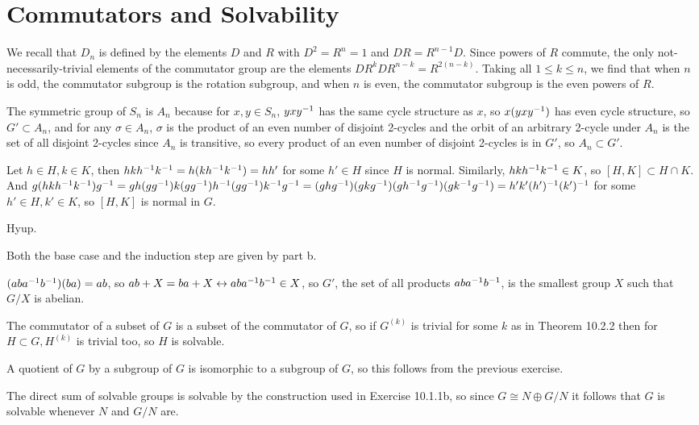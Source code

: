 \documentclass[11pt, oneside]{article}   	%
\begin{document}
\section{Commutators and Solvability}
\be
\item We recall that $D_n$ is defined by the elements $D$ and $R$ with $D^2 = R^n = 1$ and $DR = R^{n-1}D$. Since powers of $R$ commute, the only not-necessarily-trivial elements of the commutator group are the elements $DR^kDR^{n-k} = R^{2(n-k)}$. Taking all $1 \le k \le n$, we find that when $n$ is odd, the commutator subgroup is the rotation subgroup, and when $n$ is even, the commutator subgroup is the even powers of $R$.
\item The symmetric group of $S_n$ is $A_n$ because for $x, y \in S_n$, $yxy^{-1}$ has the same cycle structure as $x$, so $x(yxy^{-1})$ has even cycle structure, so $G' \subset A_n$, and for any $\sigma \in A_n$, $\sigma$ is the product of an even number of disjoint 2-cycles and the orbit of an arbitrary 2-cycle under $A_n$ is the set of all disjoint 2-cycles since $A_n$ is transitive, so every product of an even number of disjoint 2-cycles is in $G'$, so $A_n \subset G'$. 
\item \be
\item Let $h \in H, k \in K$, then $hkh^{-1} k^{-1} = h(kh^{-1} k^{-1}) = hh'$ for some $h' \in H$ since $H$ is normal. Similarly, $hkh^{-1} k^{-1} \in K$, so $[H, K] \subset H \cap K$. And $g(hkh^{-1} k^{-1})g^{-1} = gh(gg^{-1})k(gg^{-1})h^{-1}(gg^{-1})k^{-1} g^{-1} = (ghg^{-1})(gkg^{-1})(gh^{-1} g^{-1})(gk^{-1} g^{-1}) = h'k'(h')^{-1}(k')^{-1}$ for some $h' \in H, k' \in K$, so $[H, K]$ is normal in $G$.
\item Hyup.
\item Both the base case and the induction step are given by part b.
\ee
\item $(aba^{-1} b^{-1})(ba) = ab$, so $ab + X = ba + X \leftrightarrow aba^{-1} b^{-1} \in X$, so $G'$, the set of all products $aba^{-1} b^{-1}$, is the smallest group $X$ such that $G/X$ is abelian.
\item The commutator of a subset of $G$ is a subset of the commutator of $G$, so if $G^{(k)}$ is trivial for some $k$ as in Theorem 10.2.2 then for $H \subset G, H^{(k)}$ is trivial too, so $H$ is solvable.
\item A quotient of $G$ by a subgroup of $G$ is isomorphic to a subgroup of $G$, so this follows from the previous exercise.
\item The direct sum of solvable groups is solvable by the construction used in Exercise 10.1.1b, so since $G \cong N \oplus G/N$ it follows that $G$ is solvable whenever $N$ and $G/N$ are.
\ee
\end{document}
